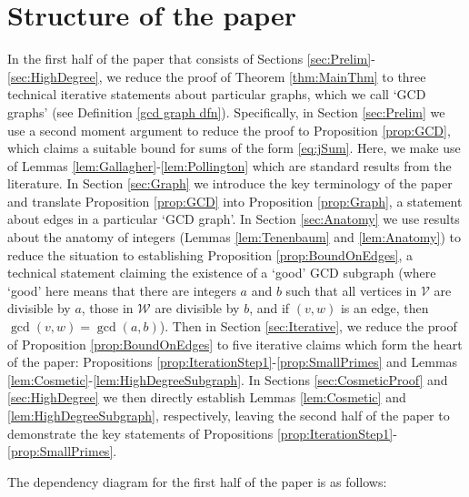 \documentclass[12pt]{amsart}
\numberwithin{equation}{section}
\theoremstyle{definition}
\theoremstyle{remark}
\newcommand{\CV}{\mathcal{V}}
\newcommand{\CW}{\mathcal{W}}
\begin{document}
\section{Structure of the paper}\label{sec:structure}
In the first half of the paper that consists of Sections \ref{sec:Prelim}-\ref{sec:HighDegree}, we reduce the proof of Theorem \ref{thm:MainThm} to three technical iterative statements about particular graphs, which we call `GCD graphs' (see Definition \ref{gcd graph dfn}). Specifically, in Section \ref{sec:Prelim} we use a second moment argument to reduce the proof to Proposition \ref{prop:GCD}, which claims a suitable bound for sums of the form \eqref{eq:jSum}. Here, we make use of Lemmas \ref{lem:Gallagher}-\ref{lem:Pollington} which are standard results from the literature. In Section \ref{sec:Graph} we introduce the key terminology of the paper and translate Proposition \ref{prop:GCD} into Proposition \ref{prop:Graph}, a statement about edges in a particular `GCD graph'. In Section \ref{sec:Anatomy} we use results about the anatomy of integers (Lemmas \ref{lem:Tenenbaum} and \ref{lem:Anatomy}) to reduce the situation to establishing Proposition \ref{prop:BoundOnEdges}, a technical statement claiming the existence of a `good' GCD subgraph (where `good' here means that there are integers $a$ and $b$ such that all vertices in $\CV$ are divisible by $a$, those in $\CW$ are divisible by $b$, and if $(v,w)$ is an edge, then $\gcd(v,w)=\gcd(a,b)$). Then in Section \ref{sec:Iterative}, we reduce the proof of Proposition \ref{prop:BoundOnEdges} to five iterative claims which form the heart of the paper:  Propositions \ref{prop:IterationStep1}-\ref{prop:SmallPrimes} and Lemmas \ref{lem:Cosmetic}-\ref{lem:HighDegreeSubgraph}. In Sections \ref{sec:CosmeticProof} and \ref{sec:HighDegree} we then directly establish Lemmas \ref{lem:Cosmetic} and \ref{lem:HighDegreeSubgraph}, respectively, leaving the second half of the paper to demonstrate the key statements of Propositions \ref{prop:IterationStep1}-\ref{prop:SmallPrimes}.

The dependency diagram for the first half of the paper is as follows:

\smallskip


  \begin{center}
   \end{center}
%
%
%
%
%
%
\end{document}
